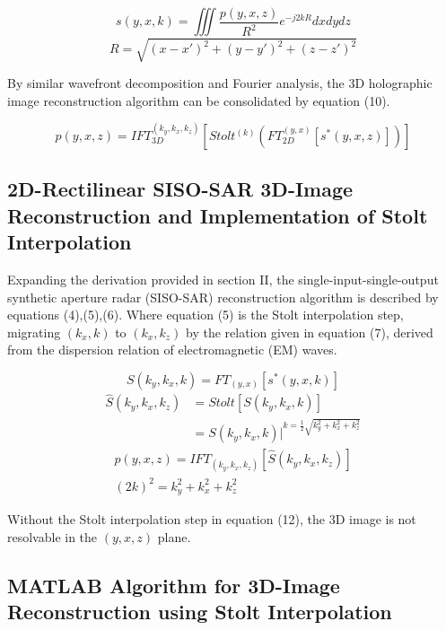 \documentclass{IEEEtran}
\begin{document}
\begin{equation}
s(y,x,k) = \iiint \frac{p(y,x,z)}{R^2} e^{-j2kR}dxdydz
\end{equation}
\begin{equation}
R = \sqrt{(x-x')^2 + (y-y')^2 + (z-z')^2}
\end{equation}

By similar wavefront decomposition and Fourier analysis, the 3D holographic image reconstruction algorithm can be consolidated by equation (10).

\begin{equation}
p(y,x,z) = IFT^{(k_y,k_x,k_z)}_{3D} \left[Stolt^{(k)}\left( FT^{(y,x)}_{2D} \left[ s^*(y,x,z) \right] \right) \right]
\end{equation}

\subsection{2D-Rectilinear SISO-SAR 3D-Image Reconstruction and Implementation of Stolt Interpolation}
Expanding the derivation provided in section II, the single-input-single-output synthetic aperture radar (SISO-SAR) reconstruction algorithm is described by equations (4),(5),(6). Where equation (5) is the Stolt interpolation step, migrating $(k_x,k)$ to $(k_x,k_z)$ by the relation given in equation (7), derived from the dispersion relation of electromagnetic (EM) waves.

\begin{equation}
S(k_y,k_x,k) = FT_{(y,x)}[s^*(y,x,k)]
\end{equation}
\begin{equation}
\begin{split}
	\hat{S}(k_y,k_x,k_z) & = Stolt[S(k_y,k_x,k)] \\
	& = S(k_y,k_x,k)\biggr\rvert^{k =\frac{1}{2} \sqrt{k_y^2 + k_x^2 + k_z^2}}
\end{split}
\end{equation}
\begin{gather}
p(y,x,z) = IFT_{(k_y,k_x,k_z)}[\hat{S}(k_y,k_x,k_z)] \\
(2k)^2 = k_y^2 + k_x^2 + k_z^2
\end{gather}

Without the Stolt interpolation step in equation (12), the 3D image is not resolvable in the $(y,x,z)$ plane.

\subsection{MATLAB Algorithm for 3D-Image Reconstruction using Stolt Interpolation}
\end{document}
